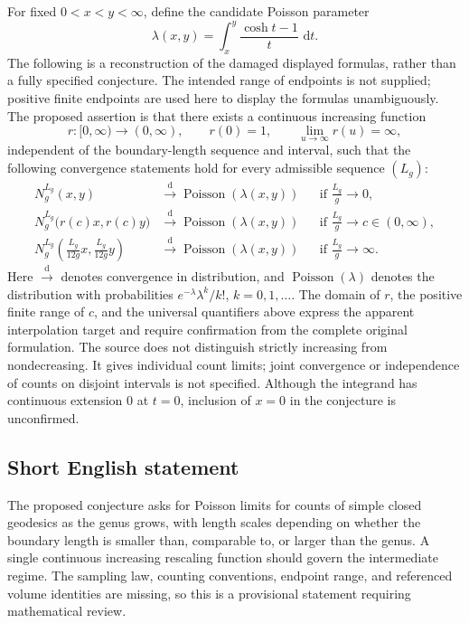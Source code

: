 \documentclass[11pt]{article}
\newcommand{\dd}{\,\mathrm{d}}
\begin{document}
For fixed \(0<x<y<\infty\), define the candidate Poisson parameter
\[
\lambda(x,y)=\int_x^y\frac{\cosh t-1}{t}\,\dd t.
\]
The following is a reconstruction of the damaged displayed formulas, rather than a fully specified conjecture. The intended range of endpoints is not supplied; positive finite endpoints are used here to display the formulas unambiguously. The proposed assertion is that there exists a continuous increasing function
\[
r:[0,\infty)\longrightarrow(0,\infty),\qquad r(0)=1,\qquad \lim_{u\to\infty}r(u)=\infty,
\]
independent of the boundary-length sequence and interval, such that the following convergence statements hold for every admissible sequence \((L_g)\):
\[
\begin{aligned}
N_g^{L_g}(x,y)&\xrightarrow{\mathrm d}\operatorname{Poisson}(\lambda(x,y))
&&\text{if }\frac{L_g}{g}\longrightarrow0,\\
N_g^{L_g}\bigl(r(c)x,r(c)y\bigr)&\xrightarrow{\mathrm d}\operatorname{Poisson}(\lambda(x,y))
&&\text{if }\frac{L_g}{g}\longrightarrow c\in(0,\infty),\\
N_g^{L_g}\left(\frac{L_g}{12g}x,\frac{L_g}{12g}y\right)&\xrightarrow{\mathrm d}\operatorname{Poisson}(\lambda(x,y))
&&\text{if }\frac{L_g}{g}\longrightarrow\infty.
\end{aligned}
\]
Here \(\xrightarrow{\mathrm d}\) denotes convergence in distribution, and \(\operatorname{Poisson}(\lambda)\) denotes the distribution with probabilities \(e^{-\lambda}\lambda^k/k!\), \(k=0,1,\ldots\). The domain of \(r\), the positive finite range of \(c\), and the universal quantifiers above express the apparent interpolation target and require confirmation from the complete original formulation. The source does not distinguish strictly increasing from nondecreasing. It gives individual count limits; joint convergence or independence of counts on disjoint intervals is not specified. Although the integrand has continuous extension \(0\) at \(t=0\), inclusion of \(x=0\) in the conjecture is unconfirmed.
\subsection{Short English statement}
The proposed conjecture asks for Poisson limits for counts of simple closed geodesics as the genus grows, with length scales depending on whether the boundary length is smaller than, comparable to, or larger than the genus. A single continuous increasing rescaling function should govern the intermediate regime. The sampling law, counting conventions, endpoint range, and referenced volume identities are missing, so this is a provisional statement requiring mathematical review.
\end{document}
